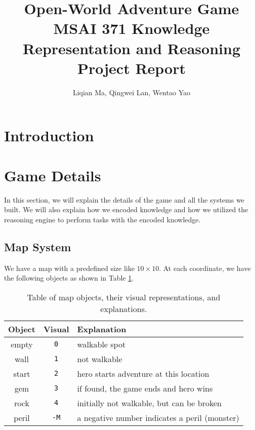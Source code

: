 \documentclass[10pt]{article}
\title{
    Open-World Adventure Game \\[.5cm]
    \normalsize MSAI 371 Knowledge Representation and Reasoning Project Report
}
\author{Liqian Ma, Qingwei Lan, Wentao Yao}
\begin{document}
\maketitle

\section{Introduction}

\cite{swiprolog}




\section{Game Details}

In this section, we will explain the details of the game and all the systems we built. We will also explain how we encoded knowledge and how we utilized the reasoning engine to perform tasks with the encoded knowledge.

\subsection{Map System}

We have a map with a predefined size like $10 \times 10$. At each coordinate, we have the following objects as shown in Table \ref{objects}.

\begin{table}[h!]
\centering
\begin{tabular}{|c|c|l|}
\hline
Object & Visual & Explanation                                           \\
\hline
empty  & \texttt{0}     & walkable spot                                 \\
wall   & \texttt{1}     & not walkable                                  \\
start  & \texttt{2}     & hero starts adventure at this location        \\
gem    & \texttt{3}     & if found, the game ends and hero wins         \\
rock   & \texttt{4}     & initially not walkable, but can be broken     \\
peril  & \texttt{-M}    & a negative number indicates a peril (monster) \\
\hline
\end{tabular}
\caption{Table of map objects, their visual representations, and explanations.}
\label{objects}
\end{table}
\end{document}

